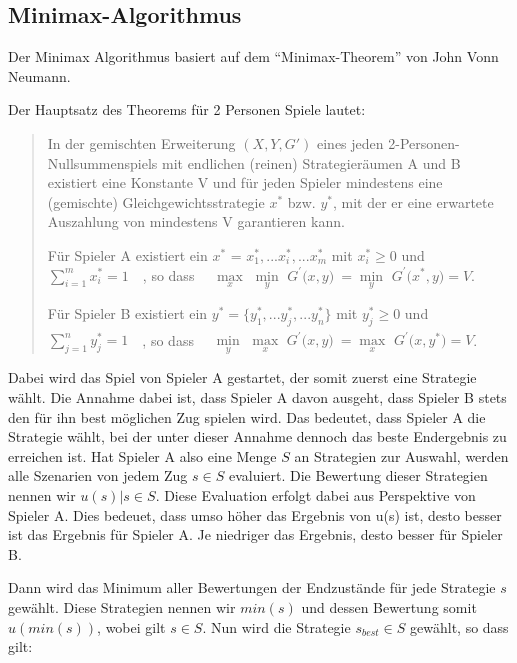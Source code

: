 \subsection{Minimax-Algorithmus}


Der Minimax Algorithmus basiert auf dem ``Minimax-Theorem''  von John Vonn Neumann.

Der Hauptsatz des Theorems für 2 Personen Spiele lautet:

\begin{quote}
In der gemischten Erweiterung $(X, Y, G')$ eines jeden 2-Personen-Nullsummenspiels mit endlichen (reinen) Strategieräumen A und B existiert eine Konstante V und für jeden Spieler mindestens eine (gemischte) Gleichgewichtsstrategie $x^*$ bzw. $y^*$, mit der er eine erwartete Auszahlung von mindestens V garantieren kann.

Für Spieler A existiert ein $x^*$ = ${x^*_1, ... x^*_i, ... x^*_m}$ mit $x^*_i \geq 0$ und $\sum_{i = 1}^m x^*_i= 1\quad $, so dass $\quad \max\limits_x$ $\min\limits_y$ $G^\prime\bigl(x,y\bigr)\ = \min\limits_y$ $G^\prime\bigl(x^*,y\bigr) = V$.

Für Spieler B existiert ein $y^* = \{ y^*_1, ... y^*_j, ... y^*_n\}$ mit $y^*_j\ge 0 $ und $\sum_{j = 1}^n y^*_j= 1\quad$, 
so dass $\quad \min\limits_y$ $\max\limits_x$ $G^\prime\bigl(x,y\bigr)\ = \max\limits_x$ $G^\prime\bigl(x,y^*\bigr) = V$.
\textsuperscript{\cite{}}
\end{quote}

Dabei wird das Spiel von Spieler A gestartet, der somit zuerst eine Strategie wählt. Die Annahme dabei ist, dass Spieler A davon ausgeht, dass Spieler B stets den für ihn best möglichen Zug spielen wird. Das bedeutet, dass Spieler A die Strategie wählt, bei der unter dieser Annahme dennoch das beste Endergebnis zu erreichen ist. Hat Spieler A also eine Menge $S$ an Strategien zur Auswahl, werden alle Szenarien von jedem Zug $s \in S$ evaluiert. Die Bewertung dieser Strategien nennen wir $u(s) | s \in S$. Diese Evaluation erfolgt dabei aus Perspektive von Spieler A. Dies bedeuet, dass umso höher das Ergebnis von u(s) ist, desto besser ist das Ergebnis für Spieler A. Je niedriger das Ergebnis, desto besser für Spieler B.

Dann wird das Minimum aller Bewertungen der Endzustände für jede Strategie $s$ gewählt. Diese Strategien nennen wir $min(s)$ und dessen Bewertung somit $u(min(s))$, wobei gilt $s \in S$. Nun wird die Strategie $s_{best} \in S$ gewählt, so dass gilt:

